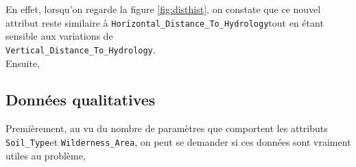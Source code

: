 \documentclass[12pt,a4paper]{article}
\numberwithin{equation}{section}
\newcommand{\hhydro}{\texttt{Horizontal\_Distance\_To\_Hydrology}}
\newcommand{\vhydro}{\texttt{Vertical\_Distance\_To\_Hydrology}}
\newcommand{\wilderness}{\texttt{Wilderness\_Area}}
\newcommand{\soil}{\texttt{Soil\_Type}}
\begin{document}
	En effet, lorsqu'on regarde la figure \ref{fig:disthist}, on constate que ce nouvel attribut reste similaire à \hhydro tout en étant sensible aux variations de\\ \vhydro.\\
	
	Ensuite, 
	

	
	\subsection{Données qualitatives}
	Premièrement, au vu du nombre de paramètres que comportent les attributs \soil et \wilderness, on peut se demander si ces données sont vraiment utiles au problème,
	
	\begin{figure}[h]
		\centering
	\hfill
	\hfill

	\medskip
	

\end{figure}
\end{document}
